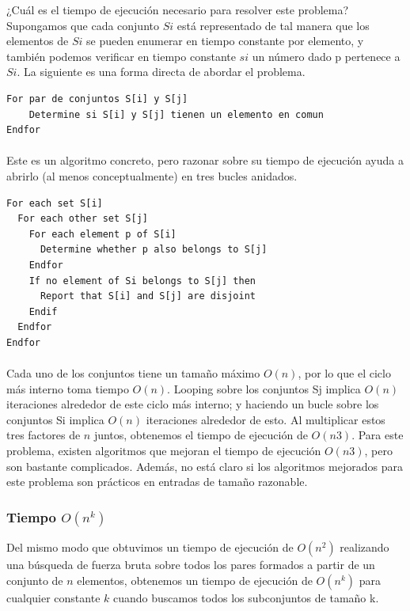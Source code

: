 \documentclass[a4paper, 12pt]{book}
\theoremstyle{dotless}
\begin{document}
¿Cuál es el tiempo de ejecución necesario para resolver este problema? Supongamos que cada conjunto $Si$ está representado de tal manera que los elementos de $Si$ se pueden enumerar en tiempo constante por elemento, y también podemos verificar en tiempo constante $si$ un número dado p pertenece a $Si$. La siguiente es una forma directa de abordar el problema.\\


\begin{lstlisting}
For par de conjuntos S[i] y S[j]
    Determine si S[i] y S[j] tienen un elemento en comun
Endfor
\end{lstlisting}
\paragraph{}
Este es un algoritmo concreto, pero razonar sobre su tiempo de ejecución ayuda a
abrirlo (al menos conceptualmente) en tres bucles anidados.\\

\begin{lstlisting}
For each set S[i]
  For each other set S[j]
    For each element p of S[i]
      Determine whether p also belongs to S[j]
    Endfor
    If no element of Si belongs to S[j] then
      Report that S[i] and S[j] are disjoint
    Endif
  Endfor
Endfor
\end{lstlisting}
\paragraph{}
Cada uno de los conjuntos tiene un tamaño máximo $O(n)$, por lo que el ciclo más interno toma tiempo $O(n)$. Looping sobre los conjuntos Sj implica $O(n)$ iteraciones alrededor de este ciclo más interno; y haciendo un bucle sobre los conjuntos Si implica $O(n)$ iteraciones alrededor de esto. Al multiplicar estos tres factores de $n$ juntos, obtenemos el tiempo de ejecución de $O(n3)$. Para este problema, existen algoritmos que mejoran el tiempo de ejecución $O(n3)$, pero son bastante complicados. Además, no está claro si los algoritmos mejorados para este problema son prácticos en entradas de tamaño razonable.\\

\subsubsection*{Tiempo $O(n^k)$} 

Del mismo modo que obtuvimos un tiempo de ejecución de $O(n^2)$ realizando una búsqueda de fuerza bruta sobre todos los pares formados a partir de un conjunto de $n$ elementos, obtenemos un tiempo de ejecución de $O(n^k)$ para cualquier constante $k$ cuando buscamos todos los subconjuntos de tamaño k.\\
\end{document}
